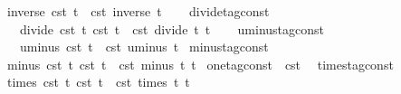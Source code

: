 \begin{isabellebody}
\ \ \ {\isacartoucheopen}inverse\ {\isacharparenleft}{\isasymtau}\isactrlsub c\isactrlsub s\isactrlsub t\ t{\isacharparenright}\ {\isacharequal}\ {\isasymtau}\isactrlsub c\isactrlsub s\isactrlsub t\ {\isacharparenleft}inverse\ t{\isacharparenright}{\isacartoucheclose}\isanewline
\isanewline
\ \ \isamarkupfalse%
\ divide{\isacharunderscore}tag{\isacharunderscore}const\ \isanewline
\ \ \ \ \ {\isacartoucheopen}divide\ {\isacharparenleft}{\isasymtau}\isactrlsub c\isactrlsub s\isactrlsub t\ t\ {\isacharparenleft}{\isasymtau}\isactrlsub c\isactrlsub s\isactrlsub t\ t\ {\isacharequal}\ {\isasymtau}\isactrlsub c\isactrlsub s\isactrlsub t\ {\isacharparenleft}divide\ t\ t\isanewline
\isanewline
\ \ \isamarkupfalse%
\ uminus{\isacharunderscore}tag{\isacharunderscore}const\isanewline
\ \ \ \ \ {\isacartoucheopen}uminus\ {\isacharparenleft}{\isasymtau}\isactrlsub c\isactrlsub s\isactrlsub t\ t{\isacharparenright}\ {\isacharequal}\ {\isasymtau}\isactrlsub c\isactrlsub s\isactrlsub t\ {\isacharparenleft}uminus\ t{\isacharparenright}{\isacartoucheclose}\isanewline
\isanewline
{}\isamarkupfalse%
\ minus{\isacharunderscore}tag{\isacharunderscore}const\isanewline
\ \ \ {\isacartoucheopen}minus\ {\isacharparenleft}{\isasymtau}\isactrlsub c\isactrlsub s\isactrlsub t\ t\ {\isacharparenleft}{\isasymtau}\isactrlsub c\isactrlsub s\isactrlsub t\ t\ {\isacharequal}\ {\isasymtau}\isactrlsub c\isactrlsub s\isactrlsub t\ {\isacharparenleft}minus\ t\ t\isanewline
\isanewline
{}\isamarkupfalse%
\ {\isacartoucheopen}one{\isacharunderscore}tag{\isacharunderscore}const\ {\isasymequiv}\ {\isasymtau}\isactrlsub c\isactrlsub s\isactrlsub t\ {}{\isacartoucheclose}\isanewline
\isanewline
{}\isamarkupfalse%
\ times{\isacharunderscore}tag{\isacharunderscore}const\isanewline
\ \ \ {\isacartoucheopen}times\ {\isacharparenleft}{\isasymtau}\isactrlsub c\isactrlsub s\isactrlsub t\ t\ {\isacharparenleft}{\isasymtau}\isactrlsub c\isactrlsub s\isactrlsub t\ t\ {\isacharequal}\ {\isasymtau}\isactrlsub c\isactrlsub s\isactrlsub t\ {\isacharparenleft}times\ t\ t\isanewline

\end{isabellebody}

